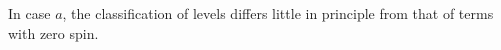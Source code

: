 In case $a$, the classification of levels differs little in principle from that of terms with zero spin.
